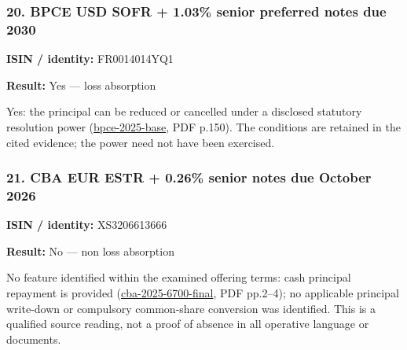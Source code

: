 \documentclass[
  11pt,
]{article}
\begin{document}
\begin{minipage}{\linewidth}

\hypertarget{bpce-usd-sofr-1.03-senior-preferred-notes-due-2030}{%
\subsubsection{20. BPCE USD SOFR + 1.03\% senior preferred notes due
2030}\label{bpce-usd-sofr-1.03-senior-preferred-notes-due-2030}}

\textbf{ISIN / identity:} FR0014014YQ1

\textbf{Result:} Yes --- loss absorption

Yes: the principal can be reduced or cancelled under a disclosed
statutory resolution power
(\href{https://www.groupebpce.com/app/uploads/2025/11/bpce-emtn-2025-base-prospectus-final.pdf}{bpce-2025-base},
PDF p.150). The conditions are retained in the cited evidence; the power
need not have been exercised.

\end{minipage}
\par\addvspace{1.1em}

\begin{minipage}{\linewidth}

\hypertarget{cba-eur-estr-0.26-senior-notes-due-october-2026}{%
\subsubsection{21. CBA EUR ESTR + 0.26\% senior notes due October
2026}\label{cba-eur-estr-0.26-senior-notes-due-october-2026}}

\textbf{ISIN / identity:} XS3206613666

\textbf{Result:} No --- non loss absorption

No feature identified within the examined offering terms: cash principal
repayment is provided
(\href{https://www.commbank.com.au/content/dam/commbank-assets/investors/2025-10/CBA-EMTN-XS3206613666-Final-Terms.pdf}{cba-2025-6700-final},
PDF pp.2--4); no applicable principal write-down or compulsory
common-share conversion was identified. This is a qualified source
reading, not a proof of absence in all operative language or documents.

\end{minipage}
\par\addvspace{1.1em}
\end{document}
